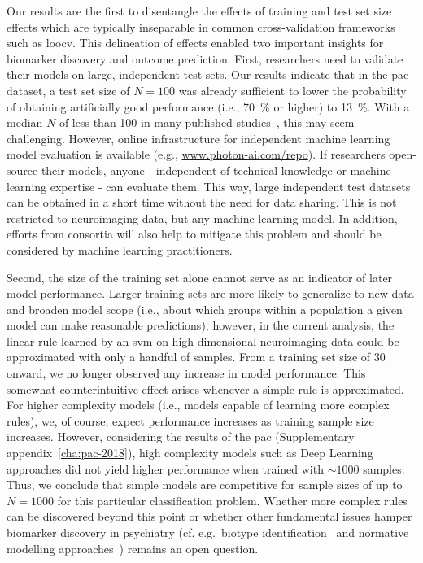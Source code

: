 \documentclass[12pt,a4paper]{article}
\begin{document}
    Our results are the first to disentangle the effects of training and test set size effects which are typically inseparable in common cross-validation frameworks such as \ac{loocv}. This delineation of effects enabled two important insights for biomarker discovery and outcome prediction. First, researchers need to validate their models on large, independent test sets. Our results indicate that in the \ac{pac} dataset, a test set size of $N=\num{100}$ was already sufficient to lower the probability of obtaining artificially good performance (i.e., \SI{70}{\percent} or higher) to \SI{13}{\percent}. With a median $N$ of less than \num{100} in many published studies~\cite{Arbabshirani2017}, this may seem challenging. However, online infrastructure for independent machine learning model evaluation is available (e.g., \url{www.photon-ai.com/repo}). If researchers open-source their models, anyone - independent of technical knowledge or machine learning expertise - can evaluate them. This way, large independent test datasets can be obtained in a short time without the need for data sharing. This is not restricted to neuroimaging data, but any machine learning model. In addition, efforts from consortia will also help to mitigate this problem and should be considered by machine learning practitioners.

    Second, the size of the training set alone cannot serve as an indicator of later model performance. Larger training sets are more likely to generalize to new data and broaden model scope (i.e., about which groups within a population a given model can make reasonable predictions), however, in the current analysis, the linear rule learned by an \ac{svm} on high-dimensional neuroimaging data could be approximated with only a handful of samples. From a training set size of \num{30} onward, we no longer observed any increase in model performance. This somewhat counterintuitive effect arises whenever a simple rule is approximated. For higher complexity models (i.e., models capable of learning more complex rules), we, of course, expect performance increases as training sample size increases. However, considering the results of the \ac{pac} (Supplementary appendix~\ref{cha:pac-2018}), high complexity models such as Deep Learning approaches did not yield higher performance when trained with $\sim\num{1000}$ samples. Thus, we conclude that simple models are competitive for sample sizes of up to $N=\num{1000}$ for this particular classification problem. Whether more complex rules can be discovered beyond this point or whether other fundamental issues hamper biomarker discovery in psychiatry (cf. e.g.\ biotype identification~\cite{Kircher2018} and normative modelling approaches~\cite{Marquand2016}) remains an open question.
\end{document}
